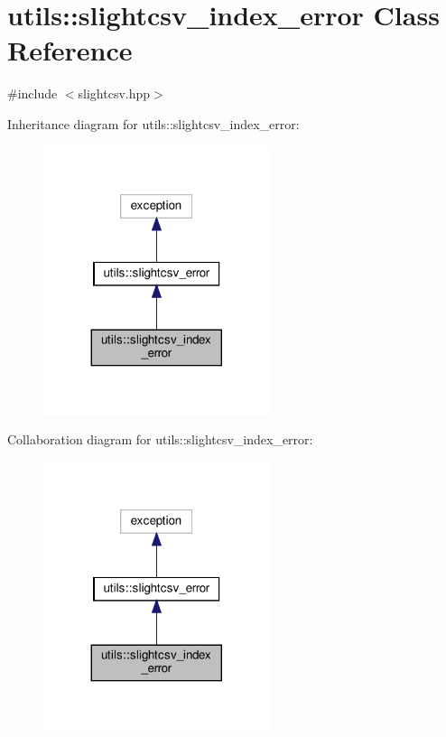 \hypertarget{classutils_1_1slightcsv__index__error}{}\section{utils\+:\+:slightcsv\+\_\+index\+\_\+error Class Reference}
\label{classutils_1_1slightcsv__index__error}


{\ttfamily \#include $<$slightcsv.\+hpp$>$}



Inheritance diagram for utils\+:\+:slightcsv\+\_\+index\+\_\+error\+:
\nopagebreak
\begin{figure}[H]
\begin{center}
\leavevmode
\includegraphics[width=188pt]{classutils_1_1slightcsv__index__error__inherit__graph}
\end{center}
\end{figure}


Collaboration diagram for utils\+:\+:slightcsv\+\_\+index\+\_\+error\+:
\nopagebreak
\begin{figure}[H]
\begin{center}
\leavevmode
\includegraphics[width=188pt]{classutils_1_1slightcsv__index__error__coll__graph}
\end{center}
\end{figure}


